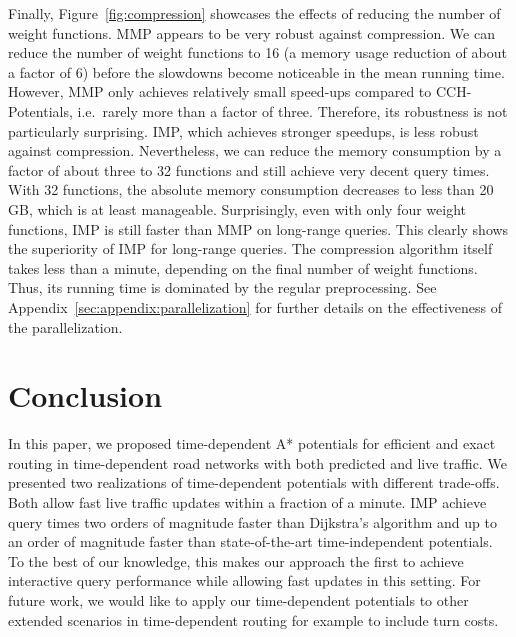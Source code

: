\documentclass[a4paper,UKenglish,cleveref, autoref, thm-restate,anonymous]{lipics-v2021}
\begin{document}
Finally, Figure~\ref{fig:compression} showcases the effects of reducing the number of weight functions.
MMP appears to be very robust against compression.
We can reduce the number of weight functions to 16 (a memory usage reduction of about a factor of 6) before the slowdowns become noticeable in the mean running time.
However, MMP only achieves relatively small speed-ups compared to CCH-Potentials, i.e.\ rarely more than a factor of three.
Therefore, its robustness is not particularly surprising.
IMP, which achieves stronger speedups, is less robust against compression.
Nevertheless, we can reduce the memory consumption by a factor of about three to 32 functions and still achieve very decent query times.
With 32 functions, the absolute memory consumption decreases to less than 20\,GB, which is at least manageable.
Surprisingly, even with only four weight functions, IMP is still faster than MMP on long-range queries.
This clearly shows the superiority of IMP for long-range queries.
The compression algorithm itself takes less than a minute, depending on the final number of weight functions.
Thus, its running time is dominated by the regular preprocessing.
See Appendix~\ref{sec:appendix:parallelization} for further details on the effectiveness of the parallelization.

\section{Conclusion}

In this paper, we proposed time-dependent A* potentials for efficient and exact routing in time-dependent road networks with both predicted and live traffic.
We presented two realizations of time-dependent potentials with different trade-offs.
Both allow fast live traffic updates within a fraction of a minute.
IMP achieve query times two orders of magnitude faster than Dijkstra's algorithm and up to an order of magnitude faster than state-of-the-art time-independent potentials.
To the best of our knowledge, this makes our approach the first to achieve interactive query performance while allowing fast updates in this setting.
For future work, we would like to apply our time-dependent potentials to other extended scenarios in time-dependent routing for example to include turn costs.

\end{document}
